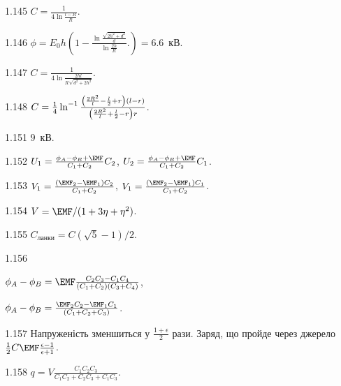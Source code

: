 \begin{Solution}{1.{145}}
	$C = \frac{1}{4\ln\frac{l - R}{R}}$.
\end{Solution}
\begin{Solution}{1.{146}}
	$\phi = E_0 h \left( 1 - \frac{\ln\frac{\sqrt{2h^2 + d^2}}{d}}{\ln\frac{2h}{R}}. \right) = 6.6$~кВ.
\end{Solution}
\begin{Solution}{1.{147}}
	$C = \frac{1}{4\ln\frac{2hl}{R\sqrt{d^2 + 2h^2}}}$.
\end{Solution}
\begin{Solution}{1.{148}}
	$C = \frac14\ln^{-1}%
		\frac{%
			\left( \frac{2R^2}{l} - \frac{l}{2} + r \right)(l - r)
		}%
		{\left( \frac{2R^2}{l} + \frac{l}{2} - r \right)r }$.
\end{Solution}
\begin{Solution}{1.{151}}
	$9$~кВ.
\end{Solution}
\begin{Solution}{1.{152}}
	$U_1 = \frac{\phi_A - \phi_B + \EMF}{C_1 + C_2} C_2$,
	$U_2 = \frac{\phi_A - \phi_B + \EMF}{C_1 + C_2} C_1$.
\end{Solution}
\begin{Solution}{1.{153}}
	$V_1 = \frac{(\EMF_2 - \EMF_1) C_2}{C_1 + C_2}$, $V_1 = \frac{(\EMF_2 - \EMF_1) C_1}{C_1 + C_2}$.
\end{Solution}
\begin{Solution}{1.{154}}
	$V = \EMF/ (1 + 3\eta + \eta^2)$.
\end{Solution}
\begin{Solution}{1.{155}}
	$C_\text{ланки} = C \left( \sqrt5 -1 \right)/2$.
\end{Solution}
\begin{Solution}{1.{156}}
	\begin{enumerate*}[label=\alph*)]
		\item $\phi_A - \phi_B = \EMF\frac{C_2C_3 - C_1C_4}{\left( C_1 + C_2 \right)\left( C_3 + C_4 \right)}$,
		\item $\phi_A - \phi_B = \frac{\EMF_2C_2 - \EMF_1C_1}{\left( C_1 + C_2 + C_3 \right)}$.
	\end{enumerate*}
\end{Solution}
\begin{Solution}{1.{157}}
	Напруженість зменшиться у $\frac{1 + \epsilon}{2}$ рази. Заряд, що пройде через джерело $\frac12 C\EMF \frac{\epsilon - 1}{\epsilon  +1}$.
\end{Solution}
\begin{Solution}{1.{158}}
	$q = V \frac{C_1C_2C_3}{C_1C_2 + C_2C_3 + C_1C_3}$.
\end{Solution}

